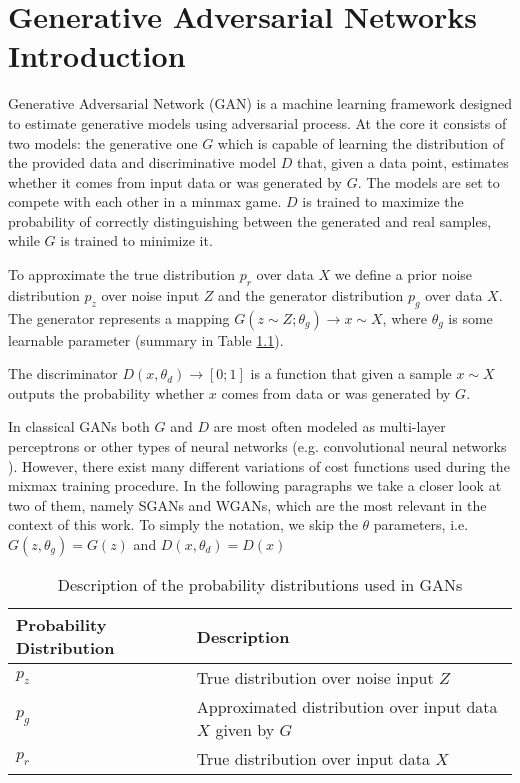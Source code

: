 \chapter{Generative Adversarial Networks Introduction}\label{chapter:gans}
Generative Adversarial Network (GAN)\cite{goodfellow2014generative} is a
machine learning framework designed to estimate generative models using
adversarial process. At the core it consists of two models: the generative one
$G$ which is capable of learning the distribution of the provided data and
discriminative model $D$ that, given a data point, estimates whether it comes
from input data or was generated by $G$. The models are set to compete with each
other in a minmax game. $D$ is trained to maximize the probability of correctly
distinguishing between the generated and real samples, while $G$ is trained to
minimize it.  

To approximate the true distribution $p_r$ over data $X$ we define a prior noise
distribution $p_z$ over noise input $Z$ and the generator distribution $p_g$
over data $X$. The generator represents a mapping
$G(z \sim Z; \theta_g) \to x \sim X$, where $\theta_g$ is some learnable
parameter (summary in Table \ref{tab:gan_probabilities}).

The discriminator $D(x, \theta_d) \to [0;1]$ is a function that given a sample $x
\sim X$ outputs the probability whether $x$ comes from data or was generated by
$G$. 

In classical GANs both $G$ and $D$ are most often modeled as multi-layer
perceptrons\cite{goodfellow2014generative} or other types of neural networks
(e.g. convolutional neural networks \cite{radford2016unsupervised}). However,
there exist many different variations of cost functions used during the mixmax
training procedure. In the following paragraphs we take a closer look at two of
them, namely SGANs and WGANs, which are the most relevant in the context of this
work. To simply the notation, we skip the $\theta$ parameters, i.e. $G(z,
\theta_g) = G(z)$ and $D(x, \theta_d) = D(x)$
\begin{table}[]
  \centering
  \begin{tabular}{|l|l|}
    \hline
    Probability Distribution & Description  \\ \hline
    $p_z$ & True distribution over noise input $Z$ \\ \hline
    $p_g$&  Approximated distribution over input data $X$ given by $G$ \\ \hline
    $p_r$&  True distribution over input data $X$\\ \hline
  \end{tabular}
  \caption{\label{tab:gan_probabilities} Description of the probability
    distributions used in GANs}
\end{table}

